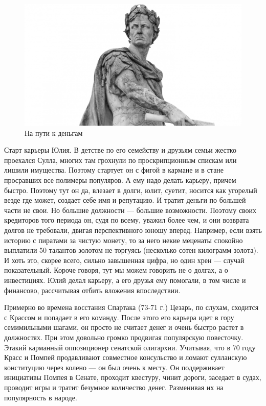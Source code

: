 \begin{figure}[h!tb]
	\centering\includegraphics[scale=0.3]{Data/Caesar_and_money/16233341651643368.png}
	\caption{На пути к деньгам
	}
	\label{fig:caes1} %
\end{figure}
Старт карьеры Юлия. В детстве по его семейству и друзьям семьи жестко проехался Сулла, многих там грохнули по проскрипционным спискам или лишили имущества. Поэтому стартует он с фигой в кармане и в стане просравших все полимеры популяров. А ему надо делать карьеру, причем быстро. Поэтому тут он да, влезает в долги, юлит, суетит, носится как угорелый везде где может, создает себе имя и репутацию. И тратит деньги по большей части не свои. Но большие должности — большие возможности. Поэтому своих кредиторов того периода он, судя по всему, уважил более чем, и они возврата долгов не требовали, двигая перспективного юношу вперед. Например, если взять историю с пиратами за чистую монету, то за него некие меценаты спокойно выплатили 50 талантов золотом не торгуясь (несколько сотен килограмм золота). И хоть это, скорее всего, сильно завышенная цифра, но один хрен — случай показательный. Короче говоря, тут мы можем говорить не о долгах, а о инвестициях. Юлий делал карьеру, а его друзья ему помогали, в том числе и финансово, рассчитывая отбить вложения впоследствии.


Примерно во времена восстания Спартака (73-71 г.) Цезарь, по слухам, сходится с Крассом и попадает в его команду. После этого его карьера идет в гору семимильными шагами, он просто не считает денег и очень быстро растет в должностях. При этом довольно громко продвигая популярскую повесточку. Этакий карманный оппозиционер сенатской олигархии. Учитывая, что в 70 году Красс и Помпей продавливают совместное консульство и ломают сулланскую конституцию через колено — он был очень к месту. Он поддерживает инициативы Помпея в Сенате, проходит квестуру, чинит дороги, заседает в судах, проводит игры и тратит безумное количество денег. Разменивая их на популярность в народе.


